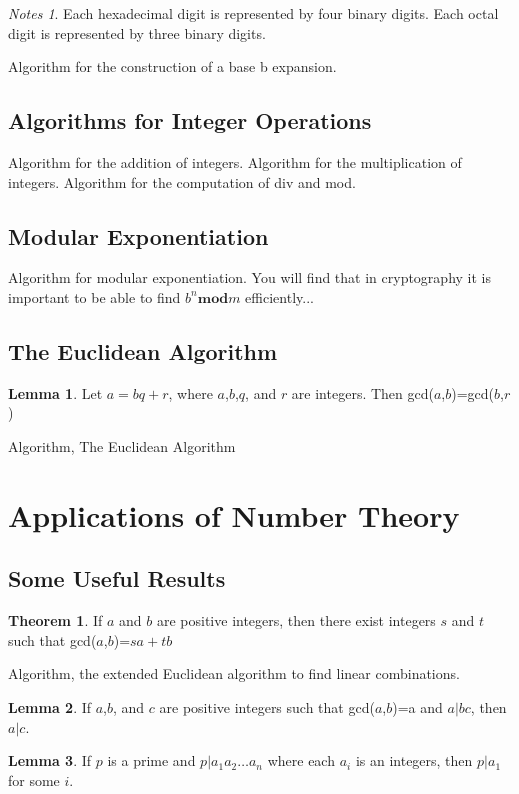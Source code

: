 \documentclass[11pt]{book} %
\theoremstyle {definition}
\newtheorem {theorem}{Theorem}[section]
\newtheorem{lemma}{Lemma}[section]
\theoremstyle {remark}
\newtheorem*{notes}{Notes}
\begin{document}
\begin{notes}
Each hexadecimal digit is represented by four binary digits. Each octal digit is represented by three binary digits.
\end{notes}

Algorithm for the construction of a base b expansion.
  \subsection {Algorithms for Integer Operations}
Algorithm for the addition of integers.
Algorithm for the multiplication of integers.
Algorithm for the computation of div and mod.
  \subsection {Modular Exponentiation}
Algorithm for modular exponentiation.
You will find that in cryptography it is important to be able to find $b^n \mathbf{mod} m$ efficiently...
  \subsection {The Euclidean Algorithm}
\begin{lemma}
Let $a=bq+r$, where $a$,$b$,$q$, and $r$ are integers. Then gcd($a$,$b$)=gcd($b$,$r$)
\end{lemma}
Algorithm, The Euclidean Algorithm

\section {Applications of Number Theory}
  \subsection {Some Useful Results}
\begin {theorem}
If $a$ and $b$ are positive integers, then there exist integers $s$ and $t$ such that gcd($a$,$b$)=$sa+tb$
\end {theorem}
Algorithm, the extended Euclidean algorithm to find linear combinations.

\begin{lemma}
If $a$,$b$, and $c$ are positive integers such that gcd($a$,$b$)=a and $a \vert bc$, then $a \vert c$.
\end{lemma}

\begin{lemma}
If $p$ is a prime and $p \vert a_1a_2\dots a_n$ where each $a_i$ is an integers, then $p\vert a_1$ for some $i$.
\end{lemma}
\end{document}
